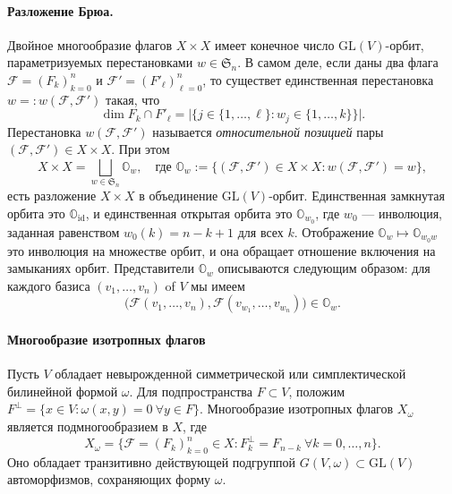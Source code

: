 \documentclass{amsart}
\theoremstyle{definition}
\begin{document}
\medskip

\paragraph{{\bf Разложение Брюа.}}
Двойное многообразие флагов $X\times X$ имеет конечное число $\mathrm{GL}(V)$-орбит, параметризуемых перестановками $w\in\mathfrak{S}_n$.
В самом деле, если даны два флага $\mathcal{F}=(F_k)_{k=0}^n$ и
$\mathcal{F}'=(F'_\ell)_{\ell=0}^n$, то существет единственная перестановка
$w=:w(\mathcal{F},\mathcal{F}')$ такая, что
\[\dim F_k\cap F'_\ell=\big|\big\{j\in\{1,\ldots,\ell\}:w_j\in\{1,\ldots,k\}\big\}\big|.\]
Перестановка $w(\mathcal{F},\mathcal{F}')$ называется \textit{относительной позицией} пары $(\mathcal{F},\mathcal{F}')\in X\times X$.
При этом
\[X\times X=\bigsqcup_{w\in\mathfrak{S}_n}\mathbb{O}_w,
\quad\mbox{где $\mathbb{O}_w:=\big\{(\mathcal{F},\mathcal{F}')\in X\times X:w(\mathcal{F},\mathcal{F}')=w\big\}$},\]
есть разложение $X\times X$ в объединение $\mathrm{GL}(V)$-орбит.
Единственная замкнутая орбита это $\mathbb{O}_{\mathrm{id}}$, и единственная открытая орбита это $\mathbb{O}_{w_0}$, где $w_0$ --- инволюция, заданная равенством
$w_0(k)=n-k+1$ для всех $k$. Отображение
$\mathbb{O}_w\mapsto\mathbb{O}_{w_0w}$ это инволюция на множестве орбит, и она обращает отношение включения на замыканиях орбит. Представители $\mathbb{O}_w$ описываются следующим образом:
для каждого базиса $(v_1,\ldots,v_n)$ of $V$ мы имеем
\[\big(\mathcal{F}(v_1,\ldots,v_n),\mathcal{F}(v_{w_1},\ldots,v_{w_n})\big)\in\mathbb{O}_w.\]

\medskip

\paragraph{{\bf Многообразие изотропных флагов}} Пусть $V$ обладает невырожденной симметрической или симплектической  билинейной формой $\omega$.
Для подпространства $F\subset V$, положим $F^\perp=\{x\in V:\omega(x,y)=0\ \forall y\in F\}$.
Многообразие  изотропных флагов $X_\omega$ является подмногообразием  в $X$, где
\begin{equation}
\label{2.2.Xomega}
X_\omega=\{\mathcal{F}=(F_k)_{k=0}^n\in X:F_k^\perp=F_{n-k}\ \forall k=0,\ldots,n\}.
\end{equation}
Оно обладает транзитивно действующей подгруппой
$G(V,\omega)\subset\mathrm{GL}(V)$ автоморфизмов, сохраняющих форму $\omega$.
\end{document}
